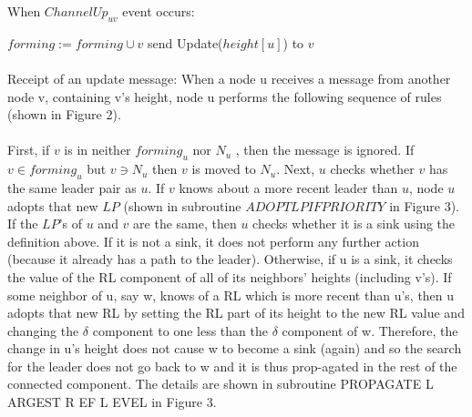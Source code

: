 \begin{algorithm}
	\caption{When $ChannelUp_{uv}$ event occurs:}
	\begin{algorithmic}[1]
		
	\State $forming := forming \cup {v}$
	\State send Update($height[u]$) to $v$
		
	\end{algorithmic}
\end{algorithm}

\paragraph{}Receipt of an update message: When a node u receives a message from another node v, containing v’s height, node u performs the following sequence of rules (shown in Figure 2).
\paragraph{}First, if $v$ is in neither $forming_u$ nor $N_u$ , then the message is ignored. If $v \in forming_u$ but $v \ni N_u$ then $v$ is moved to $N_u$. Next, $u$ checks whether $v$ has the same leader pair as $u$. If $v$ knows about a more recent leader than $u$, node $u$ adopts that new $LP$ (shown in subroutine $ADOPTLPIFPRIORITY$ in Figure 3). If the $LP$’s of $u$ and $v$ are the same, then $u$ checks whether it is a sink using the definition above. If it is not a sink, it does not perform any further action (because it already has a path to the leader). Otherwise, if u is a sink, it checks the value of the RL component of all of its neighbors’ heights (including v’s). If some neighbor of u, say w, knows of a RL which is more recent than u’s, then u adopts that new RL by setting the RL part of its height to the new RL value and changing the $\delta$ component to one less than the $\delta$ component of w. Therefore, the change in u’s height does not cause w to become a sink (again) and so the search for the leader does not go back to w and it is thus prop-agated in the rest of the connected component. The details are shown in subroutine PROPAGATE L ARGEST R EF L EVEL in Figure 3.
